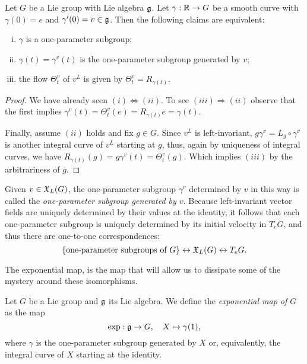 \begin{proposition}
  Let $G$ be a Lie group with Lie algebra $\mathfrak{g}$.
  Let $\gamma:\mathbb{R}\to G$ be a smooth curve with $\gamma(0)=e$ and $\gamma'(0)=v\in\mathfrak{g}$. Then the following claims are equivalent:
  \begin{enumerate}[(i)]
    \item $\gamma$ is a one-parameter subgroup;
    \item $\gamma(t) = \gamma^v(t)$ is the one-parameter subgroup generated by $v$;
    \item the flow $\Theta_t^v$ of $v^L$ is given by $\Theta_t^v = R_{\gamma(t)}$.
  \end{enumerate}
\end{proposition}
\begin{proof}
  We have already seen $(i) \Leftrightarrow (ii)$.
  To see $(iii)\Rightarrow(ii)$ observe that the first implies $\gamma^v(t) = \Theta_t^v(e) = R_{\gamma(t)}e = \gamma(t)$.
  
  Finally, assume $(ii)$ holds and fix $g\in G$.
  Since $v^L$ is left-invariant, $g\gamma^v = L_g \circ \gamma^v$ is another integral curve of $v^L$ starting at $g$, thus, again by uniqueness of integral curves, we have $R_{\gamma(t)}(g) = g\gamma^v(t) = \Theta_t^v(g)$. Which implies $(iii)$ by the arbitrariness of $g$.
\end{proof}

Given $v\in\mathfrak{X}_L(G)$, the one-parameter subgroup $\gamma^v$ determined by $v$ in this way is called the \emph{one-parameter subgroup generated by $v$}.
Because left-invariant vector fields are uniquely determined by their values at the identity, it follows that each one-parameter subgroup is uniquely determined by its initial velocity in $T_eG$, and thus there are one-to-one correspondences:
\begin{equation}
  \{\mbox{one-parameter subgroups of }G\}
  \leftrightarrow
  \mathfrak{X}_L(G)
  \leftrightarrow
  T_e G.
\end{equation}

The exponential map, is the map that will allow us to dissipate some of the mystery around these isomorphisms.

\begin{definition}
  Let $G$ be a Lie group and $\mathfrak{g}$ its Lie algebra.
  We define the \emph{exponential map of $G$} as the map
  \begin{equation}
    \exp: \mathfrak{g} \to G , \quad X \mapsto \gamma(1),
  \end{equation}
  where $\gamma$ is the one-parameter subgroup generated by $X$ or, equivalently, the integral curve of $X$ starting at the identity.
\end{definition}

